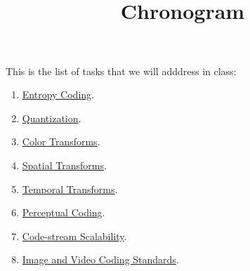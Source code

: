 

\title{\SM{} \\ Chronogram}

\maketitle

This is the list of tasks that we will adddress in class:

\begin{enumerate}
\item \href{https://sistemas-multimedia.github.io/contents/entropy_coding/#x1-110007}{Entropy Coding}.
\item \href{https://sistemas-multimedia.github.io/contents/quantization/#x1-150008}{Quantization}.
\item \href{https://sistemas-multimedia.github.io/contents/color_transforms/#x1-100006}{Color Transforms}.
\item \href{https://sistemas-multimedia.github.io/contents/spatial_transforms/#x1-80006}{Spatial Transforms}.
\item \href{https://sistemas-multimedia.github.io/contents/temporal_transforms/#x1-90008}{Temporal Transforms}.
\item \href{https://sistemas-multimedia.github.io/contents/perceptual_coding/#x1-100009}{Perceptual Coding}.
\item \href{https://sistemas-multimedia.github.io/contents/data_scalability/#x1-150008}{Code-stream Scalability}.
\item \href{https://sistemas-multimedia.github.io/contents/standards/#x1-40003}{Image and Video Coding Standards}.
\end{enumerate}
